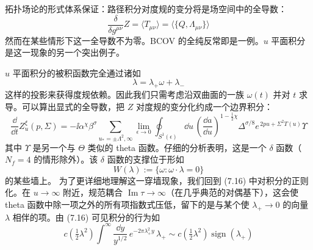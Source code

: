拓扑场论的形式体系保证：路径积分对度规的变分将是场空间中的全导数：
\begin{equation}
\frac{\delta}{\delta g^{\mu\nu}}Z=\langle T_{\mu\nu}\rangle=\langle\{Q,\Lambda_{\mu\nu}\}\rangle
\tag{7.17}
\end{equation}
然而在某些情形下这一全导数不为零。BCOV 的全纯反常即是一例。$u$ 平面积分是这一现象的另一个突出例子。

$u$ 平面积分的被积函数完全通过诸如
\begin{equation}
\lambda=\lambda_+\omega+\lambda_-
\tag{7.18}
\end{equation}
这样的投影来获得度规依赖。因此我们只需考虑沿双曲面的一族 $\omega(t)$ 并对 $t$ 求导。可以算出显式的全导数，把 $Z$ 对度规的变分化约成一个边界积分：
\begin{equation}
\frac{\dd}{\dd t}Z_u^{\xi}(p,\Sigma)
=
-\ii\alpha^{\chi}\beta^{\sigma}
\sum_{u_{*}=\pm\Lambda^{2},\infty}
\lim_{\epsilon\to0}
\oint_{S^{1}(\epsilon)}
\dd u\,
\left(\frac{\dd a}{\dd u}\right)^{1-\frac{1}{2}\chi}
\Delta^{\sigma/8}
e^{\,2pu+\Sigma^{2}T(u)}
\Upsilon
\tag{7.19}
\end{equation}
其中 $\Upsilon$ 是另一个与 $\Theta$ 类似的 theta 函数。仔细的分析表明，这是一个 $\delta$ 函数（$N_f=4$ 的情形除外）。该 $\delta$ 函数的支撑位于形如
\begin{equation}
W(\lambda):=\{\omega:\omega\cdot\lambda=0\}
\tag{7.20}
\end{equation}
的某些墙上。
为了更详细地理解这一穿墙现象，我们回到 (7.16) 中对积分的正则化。在 $u\to\infty$ 附近，规范耦合 $\operatorname{Im}\tau\to\infty$（在几乎典范的对偶基下），这会使 theta 函数中除一项之外的所有项指数式压低，留下的是与某个使 $\lambda_+\to0$ 的向量 $\lambda$ 相伴的项。由 (7.16) 可见积分的行为如
\begin{equation}
c\!\left(\tfrac{1}{2}\lambda^{2}\right)
\int^{\infty}\frac{\dd y}{y^{1/2}}\,e^{-2\pi\lambda_+^{2}y}\,\lambda_+
\sim
c\!\left(\tfrac{1}{2}\lambda^{2}\right)\operatorname{sign}(\lambda_+)
\tag{7.21}
\end{equation}

